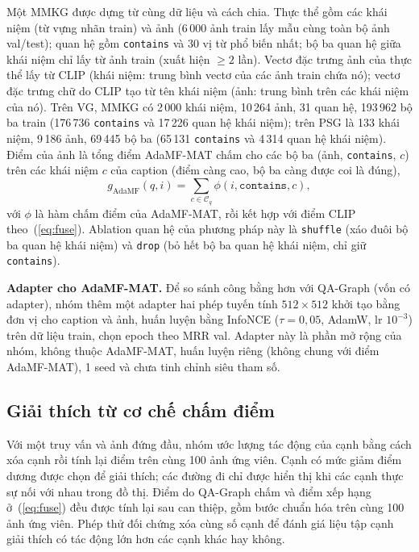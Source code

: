 \documentclass[conference]{IEEEtran}
\begin{document}
Một MMKG được dựng từ cùng dữ liệu và cách chia. Thực thể gồm các khái niệm (từ vựng nhãn train) và ảnh (6\,000 ảnh train lấy mẫu cùng toàn bộ ảnh val/test); quan hệ gồm \texttt{contains} và 30 vị từ phổ biến nhất; bộ ba quan hệ giữa khái niệm chỉ lấy từ ảnh train (xuất hiện $\ge2$ lần). Vectơ đặc trưng ảnh của thực thể lấy từ CLIP (khái niệm: trung bình vectơ của các ảnh train chứa nó); vectơ đặc trưng chữ do CLIP tạo từ tên khái niệm (ảnh: trung bình trên các khái niệm của nó). Trên VG, MMKG có 2\,000 khái niệm, 10\,264 ảnh, 31 quan hệ, 193\,962 bộ ba train (176\,736 \texttt{contains} và 17\,226 quan hệ khái niệm); trên PSG là 133 khái niệm, 9\,186 ảnh, 69\,445 bộ ba (65\,131 \texttt{contains} và 4\,314 quan hệ khái niệm). Điểm của ảnh là tổng điểm AdaMF-MAT chấm cho các bộ ba (ảnh, \texttt{contains}, $c$) trên các khái niệm $c$ của caption (điểm càng cao, bộ ba càng được coi là đúng),
\begin{equation}\label{eq:adamf}
g_{\text{AdaMF}}(q,i)=\sum_{c\in\mathcal C_q}\phi(i,\texttt{contains},c),
\end{equation}
với $\phi$ là hàm chấm điểm của AdaMF-MAT, rồi kết hợp với điểm CLIP theo~(\ref{eq:fuse}). Ablation quan hệ của phương pháp này là \texttt{shuffle} (xáo đuôi bộ ba quan hệ khái niệm) và \texttt{drop} (bỏ hết bộ ba quan hệ khái niệm, chỉ giữ \texttt{contains}).

\textbf{Adapter cho AdaMF-MAT.} Để so sánh công bằng hơn với QA-Graph (vốn có adapter), nhóm thêm một adapter hai phép tuyến tính $512\times512$ khởi tạo bằng đơn vị cho caption và ảnh, huấn luyện bằng InfoNCE ($\tau=0{,}05$, AdamW, lr $10^{-3}$) trên dữ liệu train, chọn epoch theo MRR val. Adapter này là phần mở rộng của nhóm, không thuộc AdaMF-MAT, huấn luyện riêng (không chung với điểm AdaMF-MAT), 1 seed và chưa tinh chỉnh siêu tham số.

\subsection{Giải thích từ cơ chế chấm điểm}\label{sec:m-xai}
Với một truy vấn và ảnh đứng đầu, nhóm ước lượng tác động của cạnh bằng cách xóa cạnh rồi tính lại điểm trên cùng 100 ảnh ứng viên. Cạnh có mức giảm điểm dương được chọn để giải thích; các đường đi chỉ được hiển thị khi các cạnh thực sự nối với nhau trong đồ thị. Điểm do QA-Graph chấm và điểm xếp hạng ở~(\ref{eq:fuse}) đều được tính lại sau can thiệp, gồm bước chuẩn hóa trên cùng 100 ảnh ứng viên. Phép thử đối chứng xóa cùng số cạnh để đánh giá liệu tập cạnh giải thích có tác động lớn hơn các cạnh khác hay không.
\end{document}
